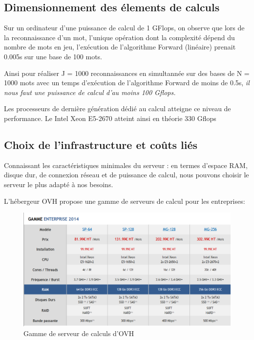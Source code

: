 \documentclass[a4paper,12pt]{report}
\begin{document}
\subsection{Dimensionnement des élements de calculs}

Sur un ordinateur d'une puissance de calcul de 1 GFlops, on observe que lors de la reconnaissance d'un mot, l'unique opération dont la complexité dépend du nombre de mots en jeu, l'exécution de l'algorithme Forward (linéaire) prenait 0.005s sur une base de 100 mots.

\medskip{}

Ainsi pour réaliser J = 1000 reconnaissances en simultannée sur des bases de N = 1000 mots avec un temps d'exécution de l'algorithme Forward de moins de 0.5s, \emph{il nous faut une puissance de calcul d'au moins 100 Gflops.}

\medskip{}

Les processeurs de dernière génération dédié au calcul atteigne ce niveau de performance. Le Intel Xeon E5-2670 atteint ainsi en théorie 330 Gflops

\subsection{Choix de l'infrastructure et coûts liés}

Connaissant les caractéristiques minimales du serveur : en termes d'espace RAM, disque dur, de connexion réseau et de puissance de calcul, nous pouvons choisir le serveur le plus adapté à nos besoins.

\medskip{}

L'hébergeur OVH propose une gamme de serveurs de calcul pour les entreprises:

\begin{figure}[H]
	\begin{center}
	\includegraphics[width=14cm]{pics/server-gamme.png} 
	\end{center}
	\caption{Gamme de serveur de calculs d'OVH}
\end{figure}
\end{document}
